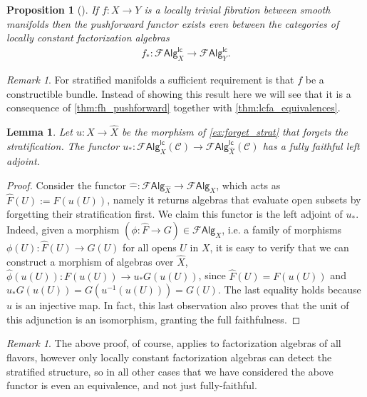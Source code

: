 \documentclass[12pt,a4paper]{article}
\newcounter{counter} \numberwithin{counter}{section}
\theoremstyle{definition}
\theoremstyle{plain}
\newtheorem{lemma}[counter]{Lemma}
\newtheorem{proposition}[counter]{Proposition}
\theoremstyle{remark}
\newtheorem{remark}[counter]{Remark}
\newcommand{\catC}{\mathscr{C}}
\newcommand{\falg}{\mathscr{F} \mathsf{Alg}}
\newcommand{\lcfa}{\mathscr{F} \mathsf{Alg}^{\mathsf{lc}}}
\begin{document}
\begin{proposition}[{\cite[prop.15]{ginot2015}}]\label{prop:pushforward_for_lc}
    If $f: X \rightarrow Y$ is a locally trivial fibration between smooth manifolds then the pushforward functor exists even between the categories of locally constant factorization algebras
    \begin{align}
        f_*: \lcfa_X \xrightarrow{\quad} \lcfa_Y.
    \end{align}
\end{proposition}

\begin{remark}\label{rem:pushlc_stratified}
    For stratified manifolds a sufficient requirement is that $f$ be a constructible bundle. Instead of showing this result here we will see that it is a consequence of \cref{thm:fh_pushforward} together with \cref{thm:lcfa_equivalences}.
\end{remark}

\begin{lemma}
    Let $u: X \rightarrow \hat{X}$ be the morphism of \cref{ex:forget_strat} that forgets the stratification.
    The functor $u_*: \lcfa_{X} (\catC) \rightarrow \lcfa_{\hat{X}} (\catC)$ has a fully faithful left adjoint.
\end{lemma}

\begin{proof}
    Consider the functor $\hat{-}: \falg_{\hat{X}} \rightarrow \falg_{X}$, which acts as $\hat{F}(U) := F(u(U))$, namely it returns algebras that evaluate open subsets by forgetting their stratification first. We claim this functor is the left adjoint of $u_*$. Indeed, given a morphism $(\phi: \hat{F} \rightarrow G) \in \falg_{X}$, i.e. a family of morphisms $\phi(U): \hat{F}(U) \rightarrow G(U)$ for all opens $U$ in $X$, it is easy to verify that we can construct a morphism of algebras over $\hat{X}$, $\hat{\phi}(u(U)): F(u(U)) \rightarrow u_*G (u(U))$, since $\hat{F}(U) = F(u(U))$ and $u_*G(u(U)) = G(u^{-1}(u(U))) = G(U)$. The last equality holds because $u$ is an injective map. In fact, this last observation also proves that the unit of this adjunction is an isomorphism, granting the full faithfulness.
\end{proof}

\begin{remark}
    The above proof, of course, applies to factorization algebras of all flavors, however only locally constant factorization algebras can detect the stratified structure, so in all other cases that we have considered the above functor is even an equivalence, and not just fully-faithful.
\end{remark}
\end{document}
